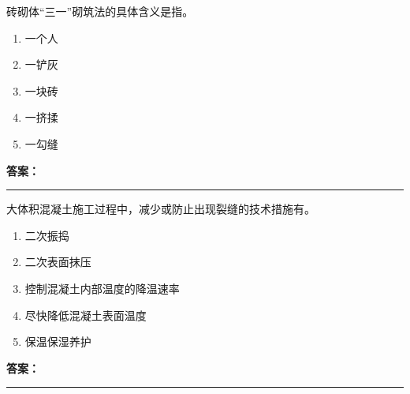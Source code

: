 \documentclass[UTF8,fontset=fandol,11pt]{ctexart}
\newcommand{\answerline}{\textcolor{answerred}{\rule{2.4cm}{0.7pt}}}
\begin{document}
\begin{quizbox}[title={乱序第 177 题｜第六章砌筑工程}]

砖砌体“三一”砌筑法的具体含义是指。\\

\begin{enumerate}[label=\Alph*.]

\item 一个人

\item 一铲灰

\item 一块砖

\item 一挤揉

\item 一勾缝

\end{enumerate}

\textbf{\textcolor{answerred}{答案：}} \answerline

\end{quizbox}

\vspace{0.2em}

\begin{quizbox}[title={乱序第 178 题｜第四章混凝土结构工程}]

大体积混凝土施工过程中，减少或防止出现裂缝的技术措施有。\\

\begin{enumerate}[label=\Alph*.]

\item 二次振捣

\item 二次表面抹压

\item 控制混凝土内部温度的降温速率

\item 尽快降低混凝土表面温度

\item 保温保湿养护

\end{enumerate}

\textbf{\textcolor{answerred}{答案：}} \answerline

\end{quizbox}

\vspace{0.2em}
\end{document}
